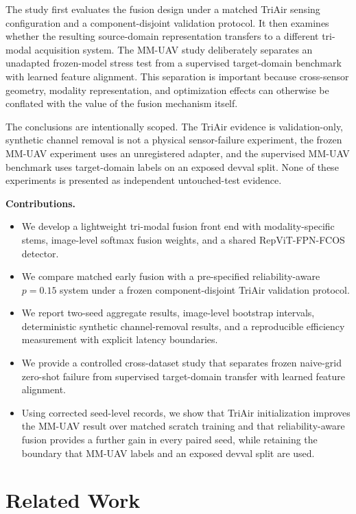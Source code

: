 \documentclass[pdflatex,sn-basic,Numbered,iicol]{sn-jnl}
\begin{document}
The study first evaluates the fusion design under a matched TriAir sensing configuration and a component-disjoint validation protocol. It then examines whether the resulting source-domain representation transfers to a different tri-modal acquisition system. The MM-UAV study deliberately separates an unadapted frozen-model stress test from a supervised target-domain benchmark with learned feature alignment. This separation is important because cross-sensor geometry, modality representation, and optimization effects can otherwise be conflated with the value of the fusion mechanism itself.

The conclusions are intentionally scoped. The TriAir evidence is validation-only, synthetic channel removal is not a physical sensor-failure experiment, the frozen MM-UAV experiment uses an unregistered adapter, and the supervised MM-UAV benchmark uses target-domain labels on an exposed devval split. None of these experiments is presented as independent untouched-test evidence.

\noindent\textbf{Contributions.}
\begin{itemize}
    \item We develop a lightweight tri-modal fusion front end with modality-specific stems, image-level softmax fusion weights, and a shared RepViT-FPN-FCOS detector.
    \item We compare matched early fusion with a pre-specified reliability-aware $p=0.15$ system under a frozen component-disjoint TriAir validation protocol.
    \item We report two-seed aggregate results, image-level bootstrap intervals, deterministic synthetic channel-removal results, and a reproducible efficiency measurement with explicit latency boundaries.
    \item We provide a controlled cross-dataset study that separates frozen naive-grid zero-shot failure from supervised target-domain transfer with learned feature alignment.
    \item Using corrected seed-level records, we show that TriAir initialization improves the MM-UAV result over matched scratch training and that reliability-aware fusion provides a further gain in every paired seed, while retaining the boundary that MM-UAV labels and an exposed devval split are used.
\end{itemize}

\section{Related Work}
\end{document}
